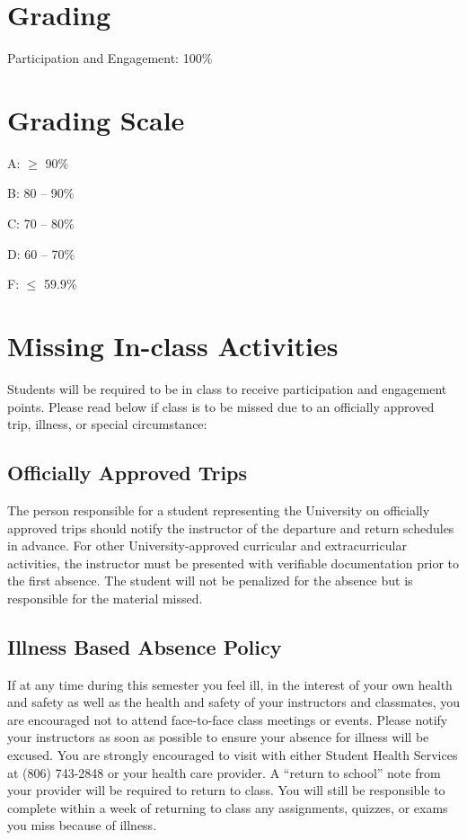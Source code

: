 \documentclass[12pt, notitlepage]{article}   	%
\begin{document}
{\section{Grading}
Participation and Engagement: 100\% \par

\section{Grading Scale}
A: $\geq$ 90\% \par
B: 80 – 90\% \par
C: 70 – 80\% \par
D: 60 – 70\% \par
F: $\leq$ 59.9\% \par

\section{Missing In-class Activities}
Students will be required to be in class to receive participation and engagement points. 
Please read below if class is to be missed due to an officially approved trip, illness, or special circumstance:

\subsection{Officially Approved Trips}
The person responsible for a student representing the University on officially 
approved trips should notify the instructor of the departure and return schedules in advance. 
For other University-approved curricular and extracurricular activities, 
the instructor must be presented with verifiable documentation prior to the first absence. 
The student will not be penalized for the absence but is responsible for the material missed.

\subsection{Illness Based Absence Policy}
If at any time during this semester you feel ill, in the interest of your own 
health and safety as well as the health and safety of your instructors and classmates, 
you are encouraged not to attend face-to-face class meetings or events. 
Please notify your instructors as soon as possible to ensure your absence for 
illness will be excused. 
You are strongly encouraged to visit with either Student Health Services at (806) 743-2848 
or your health care provider. 
A “return to school” note from your provider will be required to return to class. 
You will still be responsible to complete within a week of returning to class any 
assignments, quizzes, or exams you miss because of illness.

}
\end{document}
